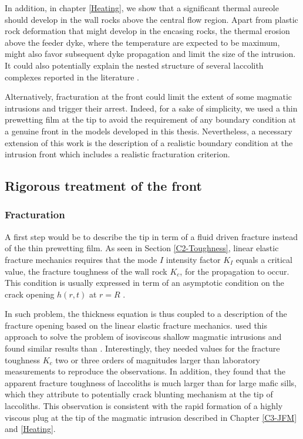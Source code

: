 In  addition, in  chapter \ref{Heating},  we show  that a  significant
thermal aureole  should develop  in the wall  rocks above  the central
flow region. Apart from plastic rock deformation that might develop in
the encasing rocks,  the thermal erosion above the  feeder dyke, where
the  temperature  are  expected  to   be  maximum,  might  also  favor
subsequent dyke  propagation and limit  the size of the  intrusion. It
could  also  potentially  explain  the  nested  structure  of  several
laccolith      complexes      reported     in      the      literature
\citep{E:2015tl,Rocchi:2010dn}.

Alternatively, fracturation  at the  front could  limit the  extent of
some magmatic intrusions and trigger  their arrest. Indeed, for a sake
of simplicity, we used a thin prewetting  film at the tip to avoid the
requirement of any boundary condition at a genuine front in the models
developed in this thesis.  Nevertheless, a necessary extension of this
work  is the  description of  a  realistic boundary  condition at  the
intrusion front which includes a realistic fracturation criterion.

\subsection{Rigorous treatment of the front}
\label{sec:rigor-treatm-front}

\subsubsection*{Fracturation}
\label{sec:fracturation}

A first step  would be to describe  the tip in term of  a fluid driven
fracture  instead of  the thin  prewetting  film. As  seen in  Section
\ref{C2-Toughness},  linear elastic  fracture mechanics  requires that
the  mode $I$  intensity factor  $K_I$  equals a  critical value,  the
fracture toughness  of the wall  rock $K_{c}$, for the  propagation to
occur. This  condition is usually  expressed in term of  an asymptotic
condition    on    the    crack     opening    $h(r,t)$    at    $r=R$
\citep{Savitski:2002gy,Bunger:2005em,Bunger:2007vs,Detournay:2014fk}.

In  such  problem,  the  thickness  equation  is  thus  coupled  to  a
description  of  the fracture  opening  based  on the  linear  elastic
fracture mechanics. \citet{Bunger:2011cb} used  this approach to solve
the  problem  of  isoviscous  shallow magmatic  intrusions  and  found
similar  results  than   \citet{Michaut:2011kg}.  Interestingly,  they
needed values for the fracture toughness  $K_c$ two or three orders of
magnitudes  larger  than  laboratory  measurements  to  reproduce  the
observations.  In  addition, they  found  that  the apparent  fracture
toughness of  laccoliths is  much larger than  for large  mafic sills,
which they  attribute to potentially  crack blunting mechanism  at the
tip  of laccoliths.  This  observation is  consistent  with the  rapid
formation  of  a highly  viscous  plug  at  the  tip of  the  magmatic
intrusion described in Chapter \ref{C3-JFM} and \ref{Heating}.

